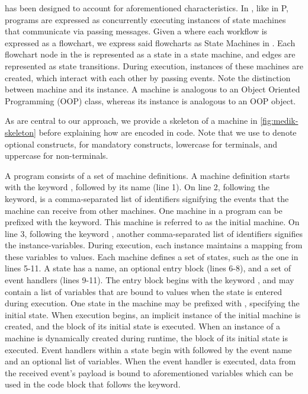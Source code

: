 \MediK{} has been designed to account for aforementioned characteristics.
In \MediK{}, like in P, programs are expressed as concurrently
executing instances of state machines that communicate via passing messages.
Given a \BPG{} where each workflow is expressed as a flowchart,
we express said flowcharts as State Machines in \MediK{}. Each flowchart node
in the \BPG{} is represented as a state in a state machine, and
edges are represented as state transitions. During execution,
instances of these machines are created, which interact with each other by
passing events. Note the distinction between
machine and its instance. A machine
is analogous to an Object Oriented Programming (OOP) class, whereas
its instance is analogous to an OOP object.

As \FSMs{} are central to our approach,  we provide a skeleton
of a \MediK{} machine in \figurename{} \ref{fig:medik-skeleton} before explaining how \BPGs{} are
encoded in \MediK{} code.
Note that we use \inlinemedik{[...]} to denote
optional constructs,  for mandatory constructs, lowercase for
terminals, and uppercase for non-terminals.

A \MediK{} program consists of a set of machine definitions.
A machine definition starts with the keyword ,
followed by its name (line 1). On line 2, following the
 keyword, is a comma-separated list of identifiers
signifying the events that the machine can receive from other machines.
One machine in a program can be
prefixed with the  keyword. This machine is referred to as the
initial machine.
On line 3, following the keyword
, another comma-separated list of identifiers signifies
the instance-variables. During execution, each instance maintains a mapping from
these variables to values. Each machine defines a set of states, such as
the one in lines 5-11. A state
 has a name, an optional entry block (lines 6-8),
and a set of event handlers (lines 9-11). The entry block
begins with the keyword , and may contain a list of variables
that are bound to values when the state is entered during execution.
One state in the machine may be prefixed with , specifying the
initial state. When execution begins, an implicit instance
of the initial machine is created, and the  block of
its initial state is executed. When an instance of a machine is dynamically
created during runtime, the  block of its initial state is executed.
Event handlers within a state begin with  followed by the event name
and an optional list of variables. When the event handler is executed, data from
the received event's payload is bound to aforementioned variables which
can be used in the code block that follows the  keyword.

